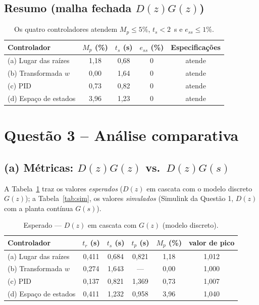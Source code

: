 \documentclass[11pt,a4paper]{article}
\begin{document}
\subsection*{Resumo (malha fechada $D(z)G(z)$)}
\begin{table}[h]
\centering
\begin{tabular}{lcccc}
\toprule
Controlador & $M_p$ (\%) & $t_s$ (s) & $e_{ss}$ (\%) & Especifica\c{c}\~oes \\
\midrule
(a) Lugar das ra\'izes   & 1{,}18 & 0{,}68 & 0 & atende \\
(b) Transformada $w$     & 0{,}00 & 1{,}64 & 0 & atende \\
(c) PID                  & 0{,}73 & 0{,}82 & 0 & atende \\
(d) Espa\c{c}o de estados& 3{,}96 & 1{,}23 & 0 & atende \\
\bottomrule
\end{tabular}
\caption{Os quatro controladores atendem $M_p\le5\%$, $t_s<2$~s e $e_{ss}\le1\%$.}
\end{table}

\section{Quest\~ao 3 -- An\'alise comparativa}

\subsection{(a) M\'etricas: $D(z)G(z)$ vs.\ $D(z)G(s)$}

A Tabela~\ref{tab:disc} traz os valores \emph{esperados} ($D(z)$ em cascata com o modelo discreto
$G(z)$); a Tabela~\ref{tab:sim}, os valores \emph{simulados} (Simulink da Quest\~ao 1, $D(z)$ com a
planta cont\'inua $G(s)$).

\begin{table}[h]
\centering
\caption{Esperado --- $D(z)$ em cascata com $G(z)$ (modelo discreto).}
\label{tab:disc}
\begin{tabular}{lccccc}
\toprule
Controlador & $t_r$ (s) & $t_s$ (s) & $t_p$ (s) & $M_p$ (\%) & valor de pico \\
\midrule
(a) Lugar das ra\'izes   & 0{,}411 & 0{,}684 & 0{,}821 & 1{,}18 & 1{,}012 \\
(b) Transformada $w$     & 0{,}274 & 1{,}643 & ---     & 0{,}00 & 1{,}000 \\
(c) PID                  & 0{,}137 & 0{,}821 & 1{,}369 & 0{,}73 & 1{,}007 \\
(d) Espa\c{c}o de estados& 0{,}411 & 1{,}232 & 0{,}958 & 3{,}96 & 1{,}040 \\
\bottomrule
\end{tabular}
\end{table}
\end{document}
